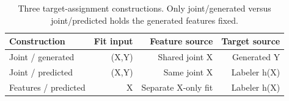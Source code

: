 \begin{table}[t]
\centering
{\small
\begin{tabular}{lrrr}
\toprule
Construction & Fit input & Feature source & Target source \\
\midrule
Joint / generated & (X,Y) & Shared joint X & Generated Y \\
Joint / predicted & (X,Y) & Same joint X & Labeler h(X) \\
Features / predicted & X & Separate X-only fit & Labeler h(X) \\
\bottomrule
\end{tabular}
}
\caption{Three target-assignment constructions. Only joint/generated versus joint/predicted holds the generated features fixed.}
\label{tab:constructions}
\end{table}
